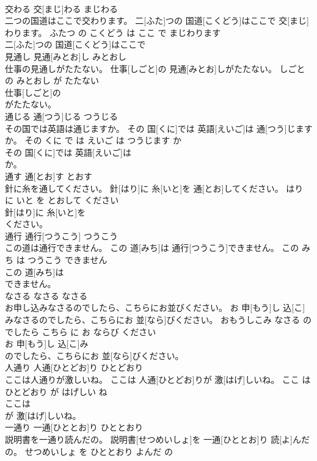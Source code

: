 \documentclass[8pt]{extreport}
\begin{document}
\begin{CJK}{UTF8}{min}
\\	交わる	交[まじ]わる	まじわる	
\\	二つの国道はここで交わります。	二[ふた]つの 国道[こくどう]はここで 交[まじ]わります。	ふたつ の こくどう は ここ で まじわります	
\\	二[ふた]つの 国道[こくどう]はここで
\\	見通し	見通[みとお]し	みとおし	
\\	仕事の見通しがたたない。	仕事[しごと]の 見通[みとお]しがたたない。	しごと の みとおし が たたない	
\\	仕事[しごと]の
\\	がたたない。			
\\	通じる	通[つう]じる	つうじる	
\\	その国では英語は通じますか。	その 国[くに]では 英語[えいご]は 通[つう]じますか。	その くに で は えいご は つうじます か	
\\	その 国[くに]では 英語[えいご]は
\\	か。			
\\	通す	通[とお]す	とおす	
\\	針に糸を通してください。	針[はり]に 糸[いと]を 通[とお]してください。	はり に いと を とおして ください	
\\	針[はり]に 糸[いと]を
\\	ください。			
\\	通行	通行[つうこう]	つうこう	
\\	この道は通行できません。	この 道[みち]は 通行[つうこう]できません。	この みち は つうこう できません	
\\	この 道[みち]は
\\	できません。			
\\	なさる	なさる	なさる	
\\	お申し込みなさるのでしたら、こちらにお並びください。	お 申[もう]し 込[こ]みなさるのでしたら、こちらにお 並[なら]びください。	おもうしこみ なさる の でしたら こちら に お ならび ください	
\\	お 申[もう]し 込[こ]み
\\	のでしたら、こちらにお 並[なら]びください。			
\\	人通り	人通[ひとどお]り	ひとどおり	
\\	ここは人通りが激しいね。	ここは 人通[ひとどお]りが 激[はげ]しいね。	ここ は ひとどおり が はげしい ね	
\\	ここは
\\	が 激[はげ]しいね。			
\\	一通り	一通[ひととお]り	ひととおり	
\\	説明書を一通り読んだの。	説明書[せつめいしょ]を 一通[ひととお]り 読[よ]んだの。	せつめいしょ を ひととおり よんだ の	

\end{CJK}
\end{document}
